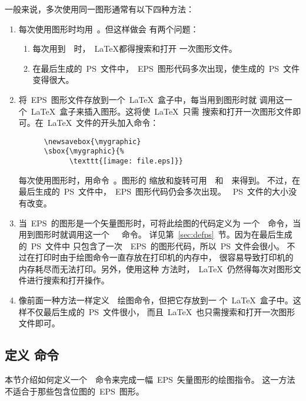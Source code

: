 一般来说，多次使用同一图形通常有以下四种方法：
\begin{enumerate}
\item 每次使用图形时均用~。但这样做会
      有两个问题：
     \begin{enumerate}
     \item 每次用到~~时，~\LaTeX{}都得搜索和打开
           一次图形文件。
     \item 在最后生成的~PS~文件中，~EPS~图形代码多次出现，使生成的~PS~文件
           变得很大。
     \end{enumerate}
\item 将~EPS~图形文件存放到一个~\LaTeX{}~盒子中，每当用到图形时就
      调用这一个~\LaTeX{}~盒子来插入图形。这将使~\LaTeX{}~只需
      搜索和打开一次图形文件即可。在~\LaTeX{}~文件的开头加入命令：
      \begin{Verbatim}
      \newsavebox{\mygraphic}
      \sbox{\mygraphic}{%
            \texttt{[image: file.eps]}}
      \end{Verbatim}
      每次使用图形时，用命令~。图形的
      缩放和旋转可用~~和~~来得到。
      不过，在最后生成的~PS~文件中，~EPS~图形代码仍会多次出现。
      ~PS~文件的大小没有改变。
\item 当~EPS~的图形是一个矢量图形时，可将此绘图的代码定义为
      一个~\PS~命令，当用到图形时就调用这一个~~\PS~命令。
      详见第~\ref{sec:defps}~节。因为在最后生成的~PS~文件中
      只包含了一次~~EPS~的图形代码，所以~PS~文件会很小。
      不过在打印时由于绘图命令一直存放在打印机的内存中，
      很容易导致打印机的内存耗尽而无法打印。另外，使用这种
      方法时，~\LaTeX{}~仍然得每次对图形文件进行搜索和打开操作。
\item 像前面一种方法一样定义~\PS~绘图命令，但把它存放到一
      个~\LaTeX{}~盒子中。这样不仅最后生成的~PS~文件很小，
      而且~\LaTeX{}~也只需搜索和打开一次图形文件即可。
\end{enumerate}

\subsection{定义 \PS{} 命令}\label{ssec:defps}

本节介绍如何定义一个~\PS~命令来完成一幅~EPS~矢量图形的绘图指令。
这一方法不适合于那些包含位图的~EPS~图形。

